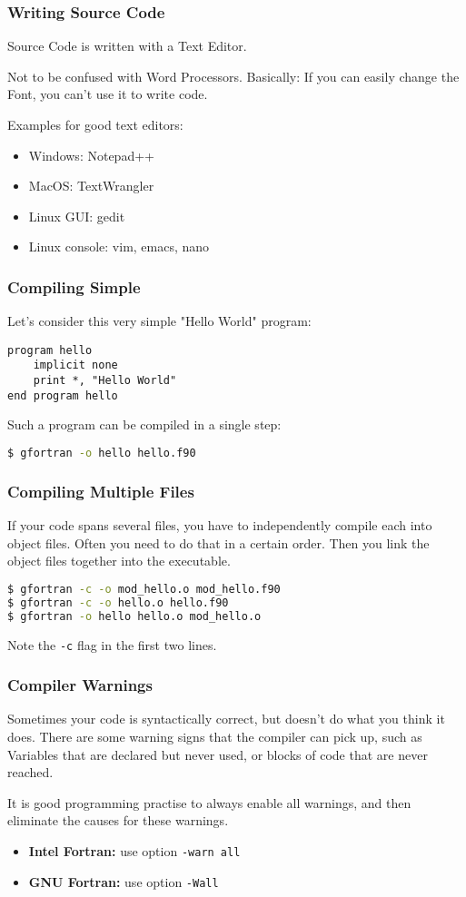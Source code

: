 \begin{frame}
  \frametitle{Writing Source Code}
  Source Code is written with a Text Editor.

  Not to be confused with Word Processors. 
  Basically: If you can easily change the Font, you can't use it to write code.

  Examples for good text editors:

  \begin{itemize}
    \item Windows: Notepad++
    \item MacOS: TextWrangler
    \item Linux GUI: gedit
    \item Linux console: vim, emacs, nano
  \end{itemize}
\end{frame}

\begin{frame}[fragile]
  \frametitle{Compiling Simple}
  Let's consider this very simple "Hello World" program:
  \begin{lstlisting}
program hello
    implicit none
    print *, "Hello World"
end program hello
  \end{lstlisting}
  Such a program can be compiled in a single step:
  \begin{lstlisting}[language=bash,numbers=none]
$ gfortran -o hello hello.f90
  \end{lstlisting}
\end{frame}

\begin{frame}[fragile]
  \frametitle{Compiling Multiple Files}
  If your code spans several files, you have to independently compile each into
  object files. Often you need to do that in a certain order.
  Then you link the object files together into the executable.

  \begin{lstlisting}[language=bash,numbers=none]
$ gfortran -c -o mod_hello.o mod_hello.f90
$ gfortran -c -o hello.o hello.f90
$ gfortran -o hello hello.o mod_hello.o
  \end{lstlisting}

  Note the \texttt{-c} flag in the first two lines.
\end{frame}

\begin{frame}[fragile]
  \frametitle{Compiler Warnings}
  Sometimes your code is syntactically correct, but doesn't do what you think it does.
  There are some warning signs that the compiler can pick up, such as 
  Variables that are declared but never used, or blocks of code that are never reached.

  It is good programming practise to always enable all warnings, and then eliminate the causes for these warnings.

  \begin{itemize}
    \item \textbf{Intel Fortran:} use option \texttt{-warn all}
    \item \textbf{GNU Fortran:} use option \texttt{-Wall}
  \end{itemize}
\end{frame}

